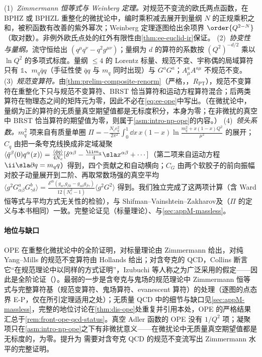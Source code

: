 \begin{proofsketch}
(1)~\emph{Zimmermann 恒等式与 Weinberg 定理。}对规范不变流的欧氏两点函数，在 BPHZ 或 BPHZL 重整化的微扰论中，编时乘积减去展开到量纲 $N$ 的正规乘积之和，被积函数有改善的紫外幂次；Weinberg 定理逐图给出余项界 $\order{Q^{2-N}}$（取对数）。非例外欧氏点处的红外有限性由\cref{thm:ee-euclid-ir}保证。
(2)~\emph{协变性与量纲。}流守恒给出 $(q^\mu q^\nu-q^2g^{\mu\nu})$；量纲为 $d$ 的算符的系数按 $(Q^2)^{-d/2}$ 乘以 $\ln Q^2$ 的多项式标度。量纲 $\le4$ 的 Lorentz 标量、规范不变、宇称偶的局域算符只有 $\mathbb 1$、$m_q\bar qq$（手征性使 $\bar qq$ 与 $m_q$ 同时出现）与 $G^aG^a$；$A^a_\mu A^{a\mu}$ 不规范不变。
(3)~\emph{规范变算符。}由\cref{thm:prelim-composite-renorm}（严格，\tagR，$R_{\mathrm{PT}}$），规范不变算符在重整化下只与规范不变算符、BRST 恰当算符和运动方程算符混合；后两类算符在物理态之间的矩阵元为零，因此不必在\cref{eq:ee-ope}中写出。（在微扰论中，量纲为正的算符的无质量真空期望值都是无标度积分，本身为零；在非微扰的真空中 BRST 恰当算符的期望值为零，则属于\cref{asm:intro-np-ope}的内容。）
(4)~\emph{领头系数。}$m_q^2$ 项来自有质量单圈 $\Pi=-\frac{N_ce_q^2}{2\pi^2}\int_0^1\dd x\,x(1-x)\ln\frac{m_q^2+x(1-x)Q^2}{\mu^2}$ 的展开；$C_q$ 由把一条夸克线换成非定域凝聚 $\langle\bar q^\beta(0)q^\alpha(x)\rangle=\frac{\langle\bar qq\rangle}{4N_c}[\delta^{\alpha\beta}-\frac{\ii m_q}4\sla x^{\alpha\beta}+\cdots]$（第二项来自运动方程 $\ii\sla\partial q=m_qq$）得到，四个贡献之和自动横向；$C_G$ 由两个软胶子的前向振幅对胶子动量展开到二阶、再取常数场强的真空平均 $\langle g^2G^a_{\alpha\beta}G^b_{\gamma\delta}\rangle=\frac{\delta^{ab}(g_{\alpha\gamma}g_{\beta\delta}-g_{\alpha\delta}g_{\beta\gamma})}{12(N_c^2-1)}\langle g^2G^2\rangle$ 得到。我们独立完成了这两项计算（含 Ward 恒等式与平均方式无关性的检验），与 Shifman--Vainshtein--Zakharov\cite{ShifmanVainshteinZakharov1979a,ShifmanVainshteinZakharov1979b}及\cite[式~(45)]{Colangelo:2000dp}（$\Pi$ 的定义与本书相同）一致。完整论证见\cite{Zimmermann1973}（标量理论）、\cite[第~12.8~节]{Collins1984}与\cref{sec:appM-massless}。
\end{proofsketch}

\paragraph{地位与缺口}OPE 在重整化微扰论中的全阶证明，对标量理论由 Zimmermann 给出\cite{Zimmermann1973}，对纯 Yang--Mills 的规范不变算符由 Hollands 给出\cite{Hollands:2007zg}；对含夸克的 QCD，Collins 断言它“在规范理论中以同样的方式证明”\cite[第~12.8~节]{Collins1984}，Izubuchi 等人称之为广泛采用的假定\cite[第~II~节]{IzubuchiEtAl2018}——因此是全阶论证（\tagA）。最弱的一步是含夸克与鬼场的规范理论中 Zimmermann 恒等式与完整算符基（规范变算符、鬼场算符、evanescent 算符）的处理（逐图的点态界 E-P，仅在所引定理适用之处）；无质量 QCD 中的细节与缺口见\cref{sec:appM-massless}，完整的地位讨论在\cref{thm:dis-ope}处重复并引用本处，OPE 的严格结果汇总于\cref{rem:front-ope-qcd-status}。真空 Adler 函数的 OPE 没有 $1/Q^2$ 项；凝聚项只在\cref{asm:intro-np-ope}之下有非微扰意义——在微扰论中无质量真空期望值都是无标度的，为零。提升为 \tagR 需要对含夸克 QCD 的规范不变流写出 Zimmermann 水平的完整证明。

